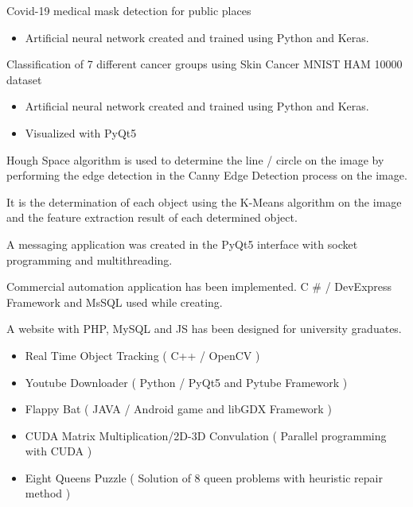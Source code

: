 \documentclass[10pt,a4paper]{altacv}
\begin{document}
\divider


Covid-19 medical mask detection for public places
\begin{itemize}
    \item Artificial neural network created and trained using Python and Keras.
\end{itemize}

\divider


Classification of 7 different cancer groups using Skin Cancer MNIST HAM 10000 dataset
\begin{itemize}
    \item Artificial neural network created and trained using Python and Keras.
    \item Visualized with PyQt5
\end{itemize}

\divider


Hough Space algorithm is used to determine the line / circle on the image by performing the edge detection in the Canny Edge Detection process on the image.


\divider

It is the determination of each object using the K-Means algorithm on the image and the feature extraction result of each determined object.


\divider

A messaging application was created in the PyQt5 interface with socket programming and multithreading.

\divider

Commercial automation application has been implemented.
C \# / DevExpress Framework and MsSQL used while creating.

\divider

A website with PHP, MySQL and JS has been designed for university graduates.
\divider

\begin{itemize}
    \item Real Time Object Tracking ( C++ / OpenCV )
    \item Youtube Downloader ( Python / PyQt5 and Pytube Framework )
    \item Flappy Bat ( JAVA / Android game and libGDX Framework )
    \item CUDA Matrix Multiplication/2D-3D Convulation ( Parallel programming with CUDA )
    \item Eight Queens Puzzle ( Solution of 8 queen problems with heuristic repair method )
\end{itemize}
\end{document}

